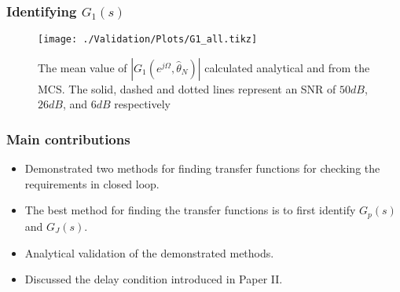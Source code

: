 \begin{frame}
	\frametitle{Identifying $G_1(s)$}
	\begin{figure}[tb]
		\texttt{[image: ./Validation/Plots/G1\_all.tikz]}
		\caption{The mean value of $|G_1(e^{j\Omega},\hat{\theta}_N)|$ calculated analytical and from the MCS\@. The solid, dashed and dotted lines represent an SNR of $50dB$, $26dB$, and $6dB$ respectively}\label{fig:G1_all}
	\end{figure}
\end{frame}
\begin{frame}
	\frametitle{Main contributions}
	\begin{itemize}
		\item Demonstrated two methods for finding transfer functions for checking the requirements in closed loop.
		\item The best method for finding the transfer functions is to first identify $G_p(s)$ and $G_J(s)$.
		\item Analytical validation of the demonstrated methods.
		\item Discussed the delay condition introduced in Paper II.
	\end{itemize}
\end{frame}


